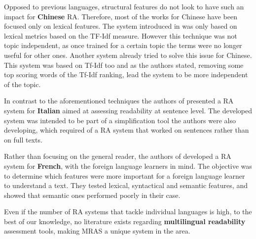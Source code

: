 \documentclass[12pt]{article}
\begin{document}
Opposed to previous languages, structural features do not look to have such an impact for \textbf{Chinese} RA. Therefore, most of the works for Chinese have been focused only on lexical features. The system introduced in \cite{chen2011chinese} was only based on lexical metrics based on the TF-Idf measure. However this technique was not topic independent, as once trained for a certain topic the terms were no longer useful for other ones. Another system \cite{collins2004language} already tried to solve this issue for Chinese. This system was based on Tf-Idf too and as the authors stated, removing some top scoring words of the Tf-Idf ranking, lead the system to be more independent of the topic. 

In contrast to the aforementioned techniques the authors of \cite{dell2011read}   presented a RA system for \textbf{Italian} aimed at assessing readability at sentence level. The developed system was intended to be part of a simplification tool the authors were also developing, which required of a RA system that worked on sentences rather than on full texts.



Rather than focusing on the general reader,  the authors of \cite{franccois2012ai} developed a RA system for \textbf{French}, with the foreign language learners in mind. The objective was to determine which features were more important for a foreign language learner to understand a text. They tested lexical, syntactical and semantic features, and showed that semantic ones performed poorly in their case.


Even if the number of RA systems that tackle individual languages is high, to the best of our knowledge, no literature exists regarding \textbf{multilingual readability} assessment tools, making MRAS a unique system in the area.
\end{document}
